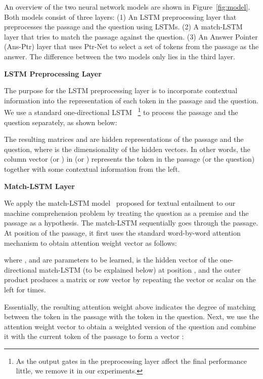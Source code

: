 \documentclass{article} \usepackage{iclr2017_conference,times}
\def\ignore#1{}
\begin{document}
An overview of the two neural network models are shown in Figure~\ref{fig:model}.
Both models consist of three layers:
(1) An LSTM preprocessing layer that preprocesses the passage and the question using LSTMs.
(2) A match-LSTM layer that tries to match the passage against the question.
(3) An Answer Pointer (Ans-Ptr) layer that uses Ptr-Net to select a set of tokens from the passage as the answer.
The difference between the two models only lies in the third layer.

\noindent \textbf{LSTM Preprocessing Layer}

The purpose for the LSTM preprocessing layer is to incorporate contextual information into the representation of each token in the passage and the question.
We use a standard one-directional LSTM~\citep{hochreiter1997long} \footnote{As the output gates in the preprocessing layer affect the final performance little, we remove it in our experiments.} to process the passage and the question separately, as shown below:

The resulting matrices  and  are hidden representations of the passage and the question, where  is the dimensionality of the hidden vectors.
In other words, the  column vector  (or ) in  (or ) represents the  token in the passage (or the question) together with some contextual information from the left.

\noindent \textbf{Match-LSTM Layer}

We apply the match-LSTM model~\citep{wang2015learning:NAACL2016} proposed for textual entailment to our machine comprehension problem by treating the question as a premise and the passage as a hypothesis.
The match-LSTM sequentially goes through the passage.
At position  of the passage, it first uses the standard word-by-word attention mechanism to obtain 
attention weight vector  as follows:

where ,  and  are parameters to be learned,  is the hidden vector of the one-directional match-LSTM (to be explained below) at position , and the outer product  produces a matrix or row vector by repeating the vector or scalar on the left for  times.


Essentially, the resulting attention weight  above indicates the degree of matching between the  token in the passage with the  token in the question.
Next, we use the attention weight vector  to obtain a weighted version of the question and combine it with the current token of the passage to form a vector :
\ignore{

}
\end{document}
